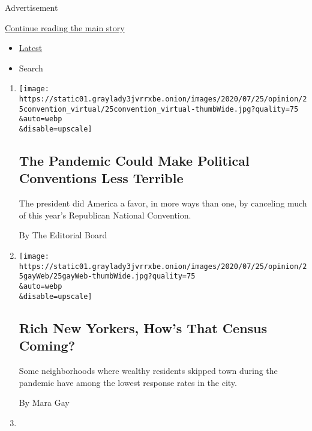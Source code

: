 Advertisement

\protect\hyperlink{after-mid1}{Continue reading the main story}

\begin{itemize}
\tightlist
\item
  \protect\hyperlink{stream-panel}{Latest}
\item
  Search
\end{itemize}

\begin{enumerate}
\def\labelenumi{\arabic{enumi}.}
\item
  \href{/2020/07/25/opinion/sunday/republican-convention-trump.html}{}

  \texttt{[image: https://static01.graylady3jvrrxbe.onion/images/2020/07/25/opinion/25convention\_virtual/25convention\_virtual-thumbWide.jpg?quality=75\\\&auto=webp\\\&disable=upscale]}

  \hypertarget{the-pandemic-could-make-political-conventions-less-terrible-1}{%
  \subsection{The Pandemic Could Make Political Conventions Less
  Terrible}\label{the-pandemic-could-make-political-conventions-less-terrible-1}}

  The president did America a favor, in more ways than one, by canceling
  much of this year's Republican National Convention.

  By The Editorial Board
\item
  \href{/2020/07/25/opinion/census-new-york.html}{}

  \texttt{[image: https://static01.graylady3jvrrxbe.onion/images/2020/07/25/opinion/25gayWeb/25gayWeb-thumbWide.jpg?quality=75\\\&auto=webp\\\&disable=upscale]}

  \hypertarget{rich-new-yorkers-hows-that-census-coming}{%
  \subsection{Rich New Yorkers, How's That Census
  Coming?}\label{rich-new-yorkers-hows-that-census-coming}}

  Some neighborhoods where wealthy residents skipped town during the
  pandemic have among the lowest response rates in the city.

  By Mara Gay
\item
  \href{/2020/07/25/opinion/letters/inequality-capitalism.html}{}


\end{enumerate}

